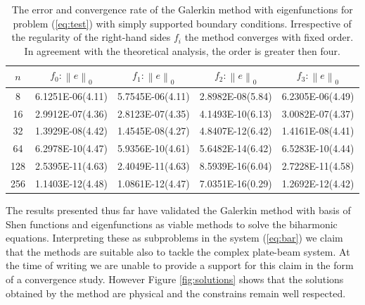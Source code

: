 \documentclass{marine_2015}
\newcommand{\norm}[1]{\ensuremath{\left\|#1\right\|}}
\begin{document}
\begin{table}[t!]
    \begin{center}
    \begin{tabular}{ccccc}
\hline
$n$  &  $f_0: \norm{e}_0$  & $f_1: \norm{e}_0$ & $f_2: \norm{e}_0$ & $f_3: \norm{e}_0$\\
\hline
8    & 6.1251E-06(4.11) & 5.7545E-06(4.11) & 2.8982E-08(5.84)& 6.2305E-06(4.49) \\
16   & 2.9912E-07(4.36) & 2.8123E-07(4.35) & 4.1493E-10(6.13)& 3.0082E-07(4.37) \\
32   & 1.3929E-08(4.42) & 1.4545E-08(4.27) & 4.8407E-12(6.42)& 1.4161E-08(4.41) \\
64   & 6.2978E-10(4.47) & 5.9356E-10(4.61) & 5.6482E-14(6.42)& 6.5283E-10(4.44) \\
128  & 2.5395E-11(4.63) & 2.4049E-11(4.63) & 8.5939E-16(6.04)& 2.7228E-11(4.58) \\
256  & 1.1403E-12(4.48) & 1.0861E-12(4.47) & 7.0351E-16(0.29)& 1.2692E-12(4.42) \\
\hline
\hline
    \end{tabular}
    \caption{The error and convergence rate of the Galerkin method with eigenfunctions for
    problem (\ref{eq:test}) with simply supported boundary conditions.
  Irrespective of the regularity of the right-hand sides $f_i$ the method
converges with fixed order. In agreement with the theoretical analysis, the
order is greater then four.}
  \label{tab:sine_convergence}
  \end{center}
  \end{table}

  The results presented thus far have validated the Galerkin method with basis
  of Shen functions and eigenfunctions as viable methods to solve the biharmonic
  equations. Interpreting these as subproblems in the system (\ref{eq:bar}) we
  claim that the methods are suitable also to tackle the complex plate-beam system.
  At the time of writing we are unable to provide a support for this claim in
  the form of a convergence study. However Figure \ref{fig:solutions} shows that
  the solutions obtained by the method are physical and the constrains remain
  well respected.
\end{document}

